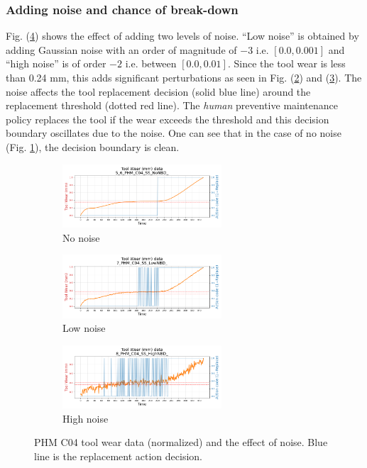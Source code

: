 \documentclass[a4paper, 12pt]{article}
\begin{document}
\subsubsection*{Adding noise and chance of break-down}
Fig. (\ref{fig:noise}) shows the effect of adding two levels of noise. ``Low noise'' is obtained by adding Gaussian noise with an order of magnitude of $-3$ i.e. $[0.0, 0.001]$ and ``high noise'' is of order $-2$ i.e. between $[0.0, 0.01]$. Since the tool wear is less than 0.24 mm, this adds significant perturbations as seen in Fig. (\ref{fig:LBD}) and (\ref{fig:HBD}). The noise affects the tool replacement decision (solid blue line) around the replacement threshold (dotted red line). The \textit{human} preventive maintenance policy replaces the tool if the wear exceeds the threshold and this decision boundary oscillates due to the noise. One can see that in the case of no noise (Fig. \ref{fig:NBD}), the decision boundary is clean.

\begin{figure}[h]
	\begin{subfigure}[b]{\textwidth}
		\centering
		\includegraphics[width=0.65\textwidth]{PHM_C04_NoNBD_wear_plot.png}  
		\caption{No noise}
		\label{fig:NBD}
	\end{subfigure}
	\begin{subfigure}[b]{\textwidth}
		\centering
		\includegraphics[width=0.65\textwidth]{PHM_C04_LowNBD_wear_plot.png}  
		\caption{Low noise}
		\label{fig:LBD}
	\end{subfigure}
	\begin{subfigure}[b]{\textwidth}
		\centering
		\includegraphics[width=0.65\textwidth]{PHM_C04_HighNBD_wear_plot.png}  
		\caption{High noise}
		\label{fig:HBD}
	\end{subfigure}
	\caption{PHM C04 tool wear data (normalized) and the effect of noise. Blue line is the replacement action decision.}
	\label{fig:noise}
\end{figure}
\end{document}
